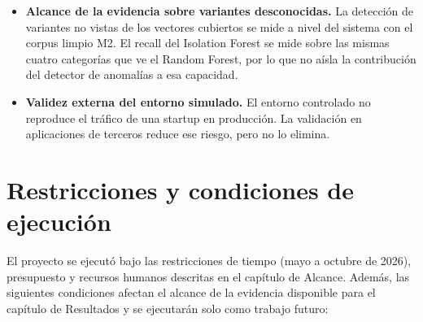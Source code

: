\begin{itemize}
    plantillas de sqlmap y CAPEC) y la clase legítima, aproximadamente 9.5 veces. SQLi es el
    59.3~\% del conjunto de prueba. Con una partición aleatoria estratificada, variantes casi
    idénticas pueden quedar en entrenamiento y en prueba, lo que puede inflar las métricas, sobre
    todo las de SQLi; este trabajo no cuantificó ese efecto. El análisis por distancia de
    Levenshtein (211 pares, todos de la fuente CAPEC) lo subestimó, porque solo compara consultas de
    1 a 100 caracteres y hasta 10{,}000 comparaciones por clase.
    \item \textbf{Alcance de la evidencia sobre variantes desconocidas.} La detección de
    variantes no vistas de los vectores cubiertos se mide a nivel del sistema con el corpus limpio
    M2. El recall del Isolation Forest se mide sobre las mismas cuatro categorías que ve el Random
    Forest, por lo que no aísla la contribución del detector de anomalías a esa capacidad.
    \item \textbf{Validez externa del entorno simulado.} El entorno controlado no reproduce el
    tráfico de una startup en producción. La validación en aplicaciones de terceros reduce ese
    riesgo, pero no lo elimina.
\end{itemize}

\section{Restricciones y condiciones de ejecución}
\label{sec:met-restricciones}

El proyecto se ejecutó bajo las restricciones de tiempo (mayo a octubre de 2026), presupuesto y
recursos humanos descritas en el capítulo de Alcance. Además, las siguientes condiciones afectan
el alcance de la evidencia disponible para el capítulo de Resultados y se ejecutarán solo como
trabajo futuro:

